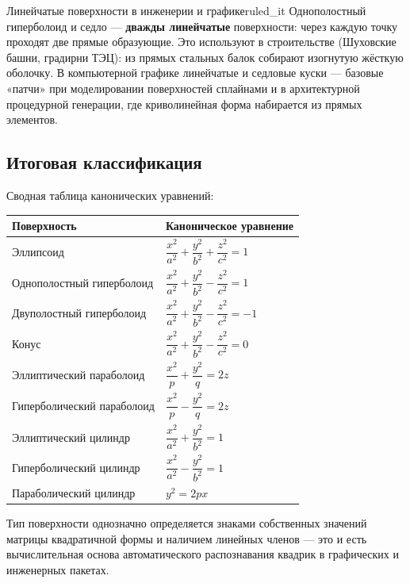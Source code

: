 \documentclass[12pt,a4paper]{article}
\begin{document}
\begin{remarkIT}{Линейчатые поверхности в инженерии и графике}{ruled_it}
  Однополостный гиперболоид и седло — \textbf{дважды линейчатые}
  поверхности: через каждую точку проходят две прямые образующие.
  Это используют в строительстве (Шуховские башни, градирни ТЭЦ): из
  прямых стальных балок собирают изогнутую жёсткую оболочку. В
  компьютерной графике линейчатые и седловые куски — базовые
  «патчи» при моделировании поверхностей сплайнами и в архитектурной
  процедурной генерации, где криволинейная форма набирается из прямых
  элементов.
\end{remarkIT}

\subsection*{Итоговая классификация}

Сводная таблица канонических уравнений:
\begin{center}
  \begin{tabular}{l l}
    \hline
    \textbf{Поверхность} & \textbf{Каноническое уравнение} \\
    \hline
    Эллипсоид & $\dfrac{x^2}{a^2}+\dfrac{y^2}{b^2}+\dfrac{z^2}{c^2}=1$ \\[2mm]
    Однополостный гиперболоид &
    $\dfrac{x^2}{a^2}+\dfrac{y^2}{b^2}-\dfrac{z^2}{c^2}=1$ \\[2mm]
    Двуполостный гиперболоид &
    $\dfrac{x^2}{a^2}+\dfrac{y^2}{b^2}-\dfrac{z^2}{c^2}=-1$ \\[2mm]
    Конус & $\dfrac{x^2}{a^2}+\dfrac{y^2}{b^2}-\dfrac{z^2}{c^2}=0$ \\[2mm]
    Эллиптический параболоид & $\dfrac{x^2}{p}+\dfrac{y^2}{q}=2z$ \\[2mm]
    Гиперболический параболоид & $\dfrac{x^2}{p}-\dfrac{y^2}{q}=2z$ \\[2mm]
    Эллиптический цилиндр & $\dfrac{x^2}{a^2}+\dfrac{y^2}{b^2}=1$ \\[2mm]
    Гиперболический цилиндр & $\dfrac{x^2}{a^2}-\dfrac{y^2}{b^2}=1$ \\[2mm]
    Параболический цилиндр & $y^2=2px$ \\
    \hline
  \end{tabular}
\end{center}

Тип поверхности однозначно определяется знаками собственных значений
матрицы квадратичной формы и наличием линейных членов — это и есть
вычислительная основа автоматического распознавания квадрик в
графических и инженерных пакетах.
\end{document}
